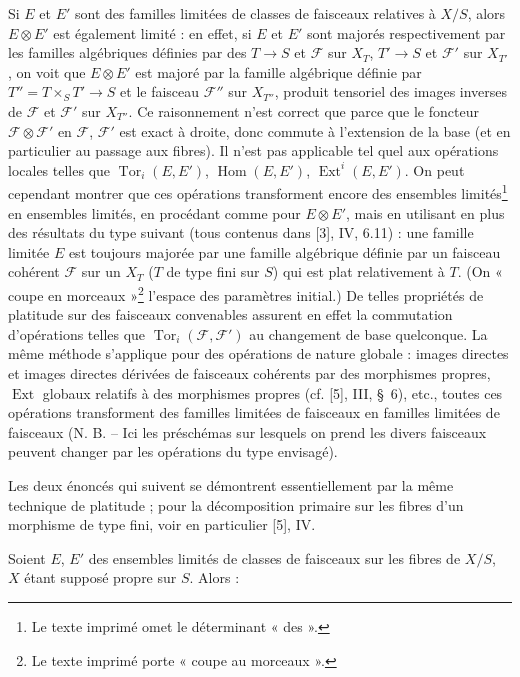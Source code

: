 Si $E$ et $E'$ sont des familles limitées de classes de faisceaux relatives à
$X/S$, alors $E\otimes E'$ est également limité : en effet, si $E$ et $E'$ sont
majorés respectivement par les familles algébriques définies par des
$T\longrightarrow S$ et $\mathcal F$ sur $X_T$, $T'\longrightarrow S$ et
$\mathcal F'$ sur $X_{T'}$, on voit que $E\otimes E'$ est majoré par la famille
algébrique définie par $T''=T\times_S T'\longrightarrow S$ et le faisceau
$\mathcal F''$ sur $X_{T''}$, produit tensoriel des images inverses de
$\mathcal F$ et $\mathcal F'$ sur $X_{T''}$. Ce raisonnement n'est correct que
parce que le foncteur $\mathcal F\otimes\mathcal F'$ en $\mathcal F$,
$\mathcal F'$ est exact à droite, donc commute à l'extension de la base (et en
particulier au passage aux fibres). Il n'est pas applicable tel quel aux
opérations locales telles que $\operatorname{Tor}_i(E,E')$,
$\operatorname{Hom}(E,E')$, $\operatorname{Ext}^i(E,E')$. On peut cependant
montrer que ces opérations transforment encore des ensembles limités\footnote{Le texte imprimé omet le déterminant « des ».} en ensembles
limités, en procédant comme pour $E\otimes E'$, mais en utilisant en plus des
résultats du type suivant (tous contenus dans [3], IV, 6.11) : une famille
limitée $E$ est toujours majorée par une famille algébrique définie par un
faisceau cohérent $\mathcal F$ sur un $X_T$ ($T$ de type fini sur $S$) qui est
plat relativement à $T$. (On « coupe en morceaux »\footnote{Le texte imprimé porte « coupe au morceaux ».} l'espace des paramètres
initial.) De telles
propriétés de platitude sur des faisceaux convenables assurent en effet la
commutation d'opérations telles que $\operatorname{Tor}_i(\mathcal F,\mathcal
F')$ au changement de base quelconque. La même méthode s'applique pour des
opérations de nature globale : images directes et images directes dérivées de
faisceaux cohérents par des morphismes propres, $\operatorname{Ext}$ globaux
relatifs à des morphismes propres (cf. [5], III, \S~6), etc., toutes ces
opérations transforment des familles limitées de faisceaux en familles limitées
de faisceaux (N. B. -- Ici les préschémas sur lesquels on prend les divers
faisceaux peuvent changer par les opérations du type envisagé).

Les deux énoncés qui suivent se démontrent essentiellement par la même
technique de platitude ; pour la décomposition primaire sur les fibres d'un
morphisme de type fini, voir en particulier [5], IV.

 Soient $E$, $E'$ des ensembles limités de classes de
faisceaux sur les fibres de $X/S$, $X$ étant supposé propre sur $S$. Alors :

